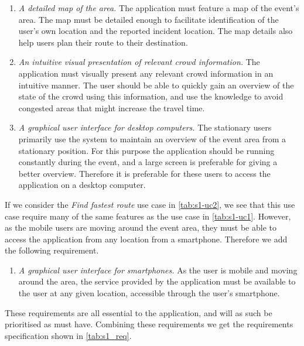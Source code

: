 \begin{enumerate}
    \item \emph{A detailed map of the area.} The application must feature a map of the event's area. The map must be detailed enough to facilitate identification of the user's own location and the reported incident location. The map details also help users plan their route to their destination.
    \item \emph{An intuitive visual presentation of relevant crowd information.} The application must visually present any relevant crowd information in an intuitive manner. The user should be able to quickly gain an overview of the state of the crowd using this information, and use the knowledge to avoid congested areas that might increase the travel time.
    \item \emph{A graphical user interface for desktop computers.} The stationary users primarily use the system to maintain an overview of the event area from a stationary position. For this purpose the application should be running constantly during the event, and a large screen is preferable for giving a better overview. Therefore it is preferable for these users to access the application on a desktop computer.
\end{enumerate}

If we consider the \emph{Find fastest route} use case in \cref{tab:s1-uc2}, we see that this use case require many of the same features as the use case in \cref{tab:s1-uc1}. However, as the mobile users are moving around the event area, they must be able to access the application from any location from a smartphone. Therefore we add the following requirement.

\begin{enumerate}[resume]
    \item \emph{A graphical user interface for smartphones.} As the user is mobile and moving around the area, the service provided by the application must be available to the user at any given location, accessible through the user's smartphone.

\end{enumerate}

These requirements are all essential to the application, and will as such be prioritised as must have. Combining these requirements we get the requirements specification shown in \cref{tab:s1_req}.

